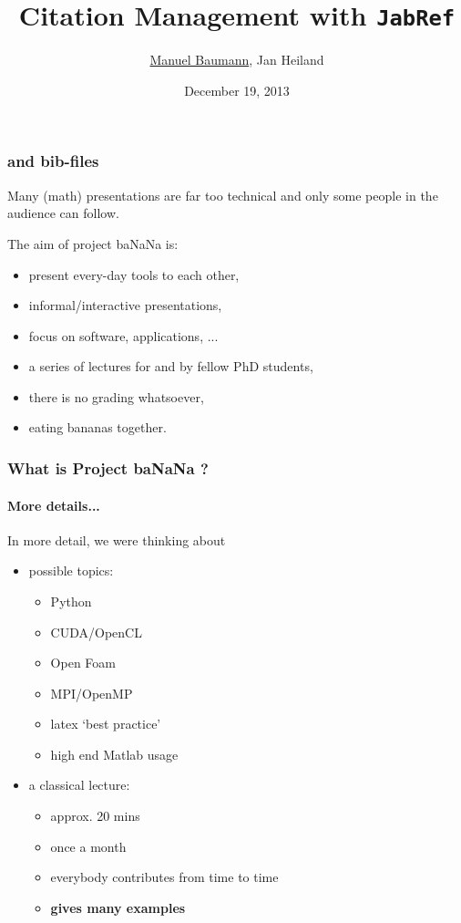 \documentclass{beamer}
\title{\huge{Citation Management with \texttt{JabRef}}}
\author{\underline{Manuel Baumann}, Jan Heiland}
\date{\footnotesize{December 19, 2013}}
\begin{document}
\frame{\titlepage}
\begin{frame}
\frametitle{\Latex and bib-files}
Many (math) presentations are far too technical and only some people in the audience can follow.

The aim of project ba\color{red}NaN\color{black}a is:
\begin{itemize}
 \item present every-day tools to each other,
 \pause
 \item informal/interactive presentations,
 \pause
 \item focus on software, applications, ...
 \pause
 \item a series of lectures for and by fellow PhD students,
 \pause
 \item there is no grading whatsoever, 
 \pause
 \item eating bananas together.
\end{itemize}
\end{frame}

\begin{frame}
\frametitle{What is Project baNaNa ?}
\framesubtitle{More details...}
In more detail, we were thinking about
\begin{itemize}
 \item possible topics:
 \begin{itemize}
 \item Python
 \item CUDA/OpenCL
 \item Open Foam
 \item MPI/OpenMP
 \item latex `best practice'
 \item high end Matlab usage
 \end{itemize}
 \item a classical lecture:
  \begin{itemize}
 \item approx. 20 mins
 \item once a month
 \item everybody contributes from time to time
 \item \textbf{gives many examples}
 \end{itemize}
\end{itemize}
\end{frame}
\end{document}
